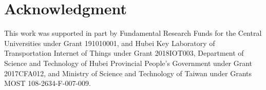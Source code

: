 \documentclass[10pt,conference,a4paper]{IEEEtran}
\begin{document}
\section*{Acknowledgment}
This work was supported in part by Fundamental Research Funds for the Central Universities under Grant 191010001, and Hubei Key Laboratory of Transportation Internet of Things under Grant 2018IOT003, Department of Science and Technology of Hubei Provincial People's Government under Grant 2017CFA012, and Ministry of Science and Technology of Taiwan under Grants MOST 108-2634-F-007-009.













\end{document}
